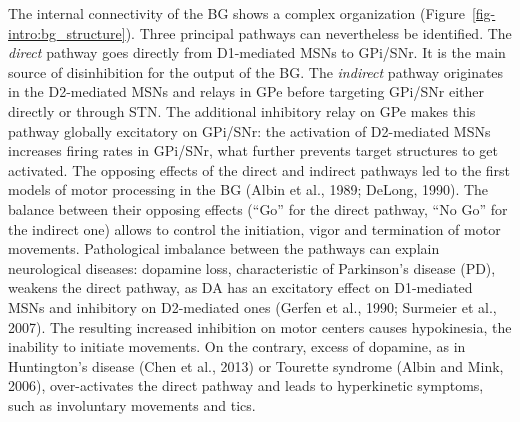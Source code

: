 \documentclass[
  11pt,
  a4paper,
]{scrbook}
\begin{document}
The internal connectivity of the BG shows a complex organization
(Figure~\ref{fig-intro:bg_structure}). Three principal pathways can
nevertheless be identified. The \emph{direct} pathway goes directly from
D1-mediated MSNs to GPi/SNr. It is the main source of disinhibition for
the output of the BG. The \emph{indirect} pathway originates in the
D2-mediated MSNs and relays in GPe before targeting GPi/SNr either
directly or through STN. The additional inhibitory relay on GPe makes
this pathway globally excitatory on GPi/SNr: the activation of
D2-mediated MSNs increases firing rates in GPi/SNr, what further
prevents target structures to get activated. The opposing effects of the
direct and indirect pathways led to the first models of motor processing
in the BG (Albin et al., 1989; DeLong, 1990). The balance between their
opposing effects (``Go'' for the direct pathway, ``No Go'' for the
indirect one) allows to control the initiation, vigor and termination of
motor movements. Pathological imbalance between the pathways can explain
neurological diseases: dopamine loss, characteristic of Parkinson's
disease (PD), weakens the direct pathway, as DA has an excitatory effect
on D1-mediated MSNs and inhibitory on D2-mediated ones (Gerfen et al.,
1990; Surmeier et al., 2007). The resulting increased inhibition on
motor centers causes hypokinesia, the inability to initiate movements.
On the contrary, excess of dopamine, as in Huntington's disease (Chen et
al., 2013) or Tourette syndrome (Albin and Mink, 2006), over-activates
the direct pathway and leads to hyperkinetic symptoms, such as
involuntary movements and tics.
\end{document}
